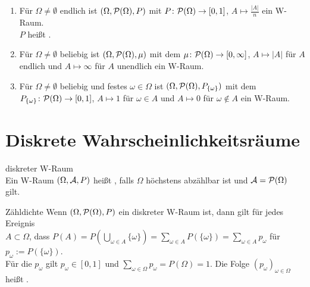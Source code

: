 \begin{Bsp}
    \begin{enumerate}
        \item
        Für $\Omega \not= \emptyset$ endlich ist $(\Omega, \P(\Omega), P)$ mit
        $P\colon \P(\Omega) \rightarrow [0, 1]$, $A \mapsto \frac{|A|}{n}$ ein W-Raum.\\
        $P$ heißt .

        \item
        Für $\Omega \not= \emptyset$ beliebig ist $(\Omega, \P(\Omega), \mu)$
        mit dem 
        $\mu\colon \P(\Omega) \rightarrow [0, \infty]$, $A \mapsto |A|$ für $A$ endlich und
        $A \mapsto \infty$ für $A$ unendlich ein W-Raum.

        \item
        Für $\Omega \not= \emptyset$ beliebig und festes $\omega \in \Omega$ ist
        $(\Omega, \P(\Omega), P_{\{\omega\}})$ mit dem \\
        $P_{\{\omega\}}\colon \P(\Omega) \rightarrow [0, 1]$,
        $A \mapsto 1$ für $\omega \in A$ und $A \mapsto 0$ für $\omega \notin A$ ein W-Raum.
    \end{enumerate}
\end{Bsp}

\section{%
    Diskrete Wahrscheinlichkeitsräume%
}

\begin{Def}{diskreter W-Raum}\\
    Ein W-Raum $(\Omega, \A, P)$ heißt , falls $\Omega$ höchstens abzählbar ist
    und $\A = \P(\Omega)$ gilt.
\end{Def}

\begin{Def}{Zähldichte}
    Wenn $(\Omega, \P(\Omega), P)$ ein diskreter W-Raum ist, dann gilt für jedes Ereignis\\
    $A \subset \Omega$, dass $P(A) = P(\bigcup_{\omega \in A} \{\omega\}) =
    \sum_{\omega \in A} P(\{\omega\}) = \sum_{\omega \in A} p_\omega$
    für $p_\omega := P(\{\omega\})$.\\
    Für die $p_\omega$ gilt $p_\omega \in [0, 1]$ und
    $\sum_{\omega \in \Omega} p_\omega = P(\Omega) = 1$.
    Die Folge $(p_\omega)_{\omega \in \Omega}$ heißt .
\end{Def}

